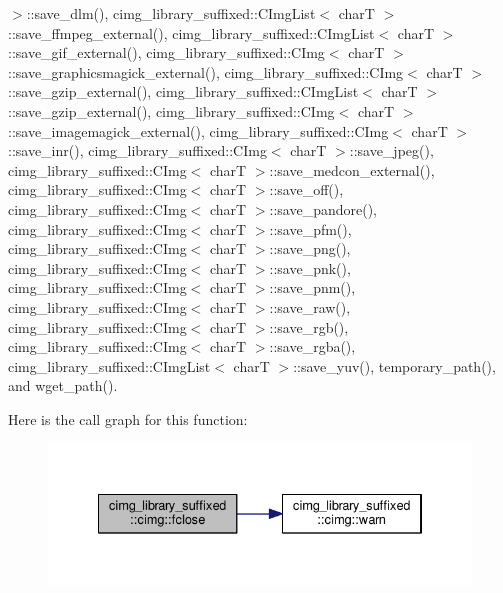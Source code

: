 $>$\+::save\+\_\+dlm(), cimg\+\_\+library\+\_\+suffixed\+::\+C\+Img\+List$<$ char\+T $>$\+::save\+\_\+ffmpeg\+\_\+external(), cimg\+\_\+library\+\_\+suffixed\+::\+C\+Img\+List$<$ char\+T $>$\+::save\+\_\+gif\+\_\+external(), cimg\+\_\+library\+\_\+suffixed\+::\+C\+Img$<$ char\+T $>$\+::save\+\_\+graphicsmagick\+\_\+external(), cimg\+\_\+library\+\_\+suffixed\+::\+C\+Img$<$ char\+T $>$\+::save\+\_\+gzip\+\_\+external(), cimg\+\_\+library\+\_\+suffixed\+::\+C\+Img\+List$<$ char\+T $>$\+::save\+\_\+gzip\+\_\+external(), cimg\+\_\+library\+\_\+suffixed\+::\+C\+Img$<$ char\+T $>$\+::save\+\_\+imagemagick\+\_\+external(), cimg\+\_\+library\+\_\+suffixed\+::\+C\+Img$<$ char\+T $>$\+::save\+\_\+inr(), cimg\+\_\+library\+\_\+suffixed\+::\+C\+Img$<$ char\+T $>$\+::save\+\_\+jpeg(), cimg\+\_\+library\+\_\+suffixed\+::\+C\+Img$<$ char\+T $>$\+::save\+\_\+medcon\+\_\+external(), cimg\+\_\+library\+\_\+suffixed\+::\+C\+Img$<$ char\+T $>$\+::save\+\_\+off(), cimg\+\_\+library\+\_\+suffixed\+::\+C\+Img$<$ char\+T $>$\+::save\+\_\+pandore(), cimg\+\_\+library\+\_\+suffixed\+::\+C\+Img$<$ char\+T $>$\+::save\+\_\+pfm(), cimg\+\_\+library\+\_\+suffixed\+::\+C\+Img$<$ char\+T $>$\+::save\+\_\+png(), cimg\+\_\+library\+\_\+suffixed\+::\+C\+Img$<$ char\+T $>$\+::save\+\_\+pnk(), cimg\+\_\+library\+\_\+suffixed\+::\+C\+Img$<$ char\+T $>$\+::save\+\_\+pnm(), cimg\+\_\+library\+\_\+suffixed\+::\+C\+Img$<$ char\+T $>$\+::save\+\_\+raw(), cimg\+\_\+library\+\_\+suffixed\+::\+C\+Img$<$ char\+T $>$\+::save\+\_\+rgb(), cimg\+\_\+library\+\_\+suffixed\+::\+C\+Img$<$ char\+T $>$\+::save\+\_\+rgba(), cimg\+\_\+library\+\_\+suffixed\+::\+C\+Img\+List$<$ char\+T $>$\+::save\+\_\+yuv(), temporary\+\_\+path(), and wget\+\_\+path().

Here is the call graph for this function\+:
\nopagebreak
\begin{figure}[H]
\begin{center}
\leavevmode
\includegraphics[width=334pt]{d4/d9b/namespacecimg__library__suffixed_1_1cimg_ac436b94e6ffef5fd420bb3d7c05fd416_cgraph}
\end{center}
\end{figure}
\mbox{\label{namespacecimg__library__suffixed_1_1cimg_a0654bf4ceae1444ae9fa1113cbb064ee}} 
